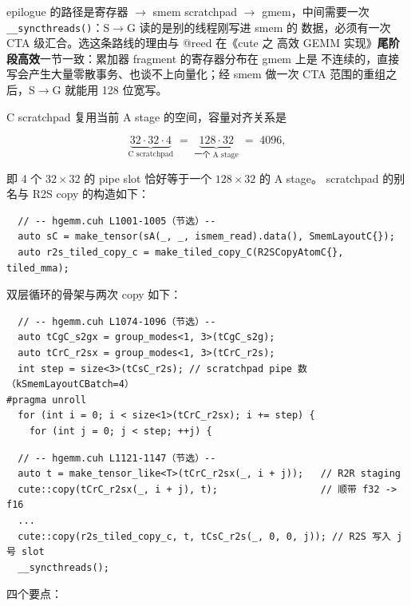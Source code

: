 epilogue 的路径是寄存器 $\to$ smem scratchpad $\to$ gmem，中间需要一次
\texttt{\_\allowbreak{}\_\allowbreak{}syncthreads\allowbreak{}()}：S$\to$G 读的是别的线程刚写进 smem 的
数据，必须有一次 CTA 级汇合。选这条路线的理由与 @reed 在《cute 之 高效 GEMM
实现》\textbf{尾阶段高效}一节一致：累加器 fragment 的寄存器分布在 gmem 上是
不连续的，直接写会产生大量零散事务、也谈不上向量化；经 smem 做一次
CTA 范围的重组之后，S$\to$G 就能用 128 位宽写。

C scratchpad 复用当前 A stage 的空间，容量对齐关系是

\begin{equation}
  \underbrace{32\cdot32\cdot4}_{\text{C scratchpad}}
  \;=\;
  \underbrace{128\cdot32}_{\text{一个 A stage}}
  \;=\; 4096 ,
  \label{eq:24-cpipe}
\end{equation}

即 4 个 $32\times32$ 的 pipe slot 恰好等于一个 $128\times32$ 的 A stage。
scratchpad 的别名与 R2S copy 的构造如下：

\begin{lstlisting}
  // -- hgemm.cuh L1001-1005（节选）--
  auto sC = make_tensor(sA(_, _, ismem_read).data(), SmemLayoutC{});
  auto r2s_tiled_copy_c = make_tiled_copy_C(R2SCopyAtomC{}, tiled_mma);
\end{lstlisting}

双层循环的骨架与两次 copy 如下：

\begin{lstlisting}
  // -- hgemm.cuh L1074-1096（节选）--
  auto tCgC_s2gx = group_modes<1, 3>(tCgC_s2g);
  auto tCrC_r2sx = group_modes<1, 3>(tCrC_r2s);
  int step = size<3>(tCsC_r2s); // scratchpad pipe 数（kSmemLayoutCBatch=4）
#pragma unroll
  for (int i = 0; i < size<1>(tCrC_r2sx); i += step) {
    for (int j = 0; j < step; ++j) {
\end{lstlisting}

\begin{lstlisting}
  // -- hgemm.cuh L1121-1147（节选）--
  auto t = make_tensor_like<T>(tCrC_r2sx(_, i + j));   // R2R staging
  cute::copy(tCrC_r2sx(_, i + j), t);                  // 顺带 f32 -> f16
  ...
  cute::copy(r2s_tiled_copy_c, t, tCsC_r2s(_, 0, 0, j)); // R2S 写入 j 号 slot
  __syncthreads();
\end{lstlisting}

四个要点：


